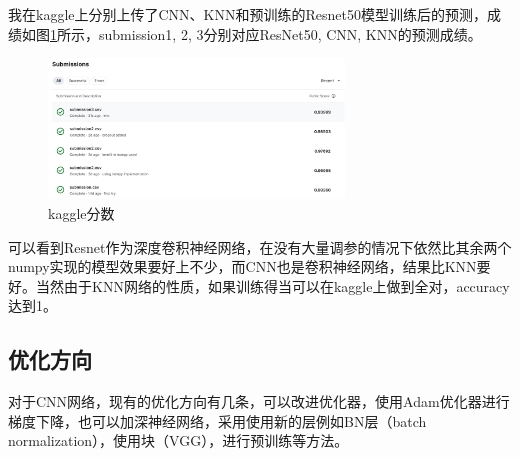 我在kaggle上分别上传了CNN、KNN和预训练的Resnet50模型训练后的预测，成绩如图\ref{fig4-3}所示，submission1, 2, 3分别对应ResNet50, CNN, KNN的预测成绩。

\begin{figure}[h!]
    \centering
    \includegraphics[width=0.7\textwidth]{figure/kaggle.png}
    \caption{kaggle分数}
    \label{fig4-3}
\end{figure}

可以看到Resnet作为深度卷积神经网络，在没有大量调参的情况下依然比其余两个numpy实现的模型效果要好上不少，而CNN也是卷积神经网络，结果比KNN要好。当然由于KNN网络的性质，如果训练得当可以在kaggle上做到全对，accuracy达到1。

\subsection{优化方向}

对于CNN网络，现有的优化方向有几条，可以改进优化器，使用Adam优化器进行梯度下降，也可以加深神经网络，采用使用新的层例如BN层（batch normalization），使用块（VGG），进行预训练等方法。